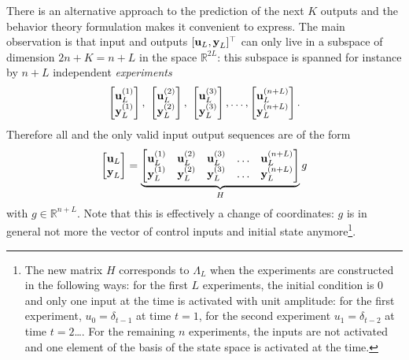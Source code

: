 There is an alternative approach to the prediction of the next $K$ outputs and the behavior theory formulation makes it convenient to express. The main observation is that input and outputs $[\boldsymbol{\mathrm{u}}_L,\boldsymbol{\mathrm{y}}_L]^\top$ can only live in a subspace of dimension $2n+K=n+L$ in the space $\mathbb{R}^{2L}$: this subspace is spanned for instance by $n+L$ independent \emph{experiments}
\begin{equation*}
  \begin{bmatrix}
    \boldsymbol{\mathrm{u}}_L^{(1)} \\ \boldsymbol{\mathrm{y}}_L^{(1)}
  \end{bmatrix},\
  \begin{bmatrix}
    \boldsymbol{\mathrm{u}}_L^{(2)} \\ \boldsymbol{\mathrm{y}}_L^{(2)}
  \end{bmatrix},\
  \begin{bmatrix}
    \boldsymbol{\mathrm{u}}_L^{(3)} \\ \boldsymbol{\mathrm{y}}_L^{(3)}
  \end{bmatrix},\ldots,
  \begin{bmatrix}
    \boldsymbol{\mathrm{u}}_L^{(n+L)} \\ \boldsymbol{\mathrm{y}}_L^{(n+L)}
  \end{bmatrix}.
\end{equation*}
Therefore all and the only valid input output sequences are of the form
\begin{equation*}
  \begin{bmatrix}
    \boldsymbol{\mathrm{u}}_L \\ \boldsymbol{\mathrm{y}}_L
  \end{bmatrix} = \underbrace{
  \begin{bmatrix}
    \boldsymbol{\mathrm{u}}_L^{(1)} & \boldsymbol{\mathrm{u}}_L^{(2)} & \boldsymbol{\mathrm{u}}_L^{(3)} & \ldots & \boldsymbol{\mathrm{u}}_L^{(n+L)} \\
    \boldsymbol{\mathrm{y}}_L^{(1)} & \boldsymbol{\mathrm{y}}_L^{(2)} & \boldsymbol{\mathrm{y}}_L^{(3)} & \ldots & \boldsymbol{\mathrm{y}}_L^{(n+L)}
  \end{bmatrix}}_{H}g
\end{equation*}
with $g\in\mathbb{R}^{n+L}$. Note that this is effectively a change of coordinates: $g$ is in general not more the vector of control inputs and initial state anymore\footnote{The new matrix $H$ corresponds to $\Lambda_L$ when the experiments are constructed in the following ways: for the first $L$ experiments, the initial condition is 0 and only one input at the time is activated with unit amplitude: for the first experiment, $u_0=\delta_{t-1}$ at time $t=1$, for the second experiment $u_1=\delta_{t-2}$ at time $t=2$\ldots. For the remaining $n$ experiments, the inputs are not activated and one element of the basis of the state space is activated at the time.}.

